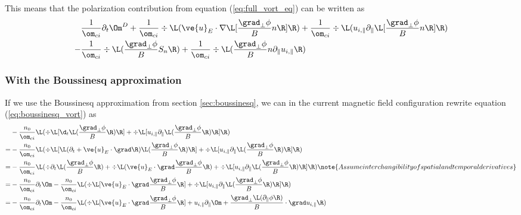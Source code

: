 This means that the polarization contribution from equation
(\ref{eq:full_vort_eq}) can be written as
%
\begin{align*}
    &
    \frac{1}{\om_{ci}}\partial_t\Om^D
    + \frac{1}{\om_{ci}} \div\L(
    \ve{u}_E\cdot\nabla \L[\frac{\grad_\perp \phi}{B}n \R]\R)
    + \frac{1}{\om_{ci}} \div\L(
    u_{i,\|}\partial_\|\L[\frac{\grad_\perp \phi}{B}n\R]\R)
    \\
    -&
  \frac{1}{\om_{ci}} \div\L( \frac{\grad_\perp \phi}{B} S_{n} \R)
 + \frac{1}{\om_{ci}}
 \div\L( \frac{\grad_\perp \phi}{B} n \partial_\| u_{i,\|} \R)
\end{align*}

\subsubsection{With the Boussinesq approximation}
If we use the Boussinesq approximation from section \ref{sec:boussinesq}, we
can in the current magnetic field configuration rewrite equation
(\ref{eq:boussinesq_vort}) as
%
\begin{align*}
    &- \frac{n_0}{\om_{ci}}
    \L( \div\L[ \d_t \L( \frac{\grad_\perp \phi}{B} \R) \R]
     + \div\L[ u_{i,\|}\partial_\| \L( \frac{\grad_\perp \phi}{B} \R) \R] \R)
     \\
     =&
     - \frac{n_0}{\om_{ci}}
     \L( \div\L[ \L(\partial_t
     + \ve{u}_E\cdot\grad\R) \L( \frac{\grad_\perp \phi}{B} \R) \R]
     + \div\L[ u_{i,\|}\partial_\| \L( \frac{\grad_\perp \phi}{B} \R) \R] \R)
     \\
     =&
     - \frac{n_0}{\om_{ci}}
     \L( \div \partial_t\L( \frac{\grad_\perp \phi}{B} \R)
     + \div \L(\ve{u}_E\cdot\grad \frac{\grad_\perp \phi}{B} \R)
     + \div\L[ u_{i,\|}\partial_\| \L( \frac{\grad_\perp \phi}{B} \R) \R] \R)
     \note{Assume interchangibility of spatial and temporal derivatives}
     \\
     =&
     - \frac{n_0}{\om_{ci}}\partial_t\Om
     - \frac{n_0}{\om_{ci}}
     \L(
     \div \L[\ve{u}_E\cdot\grad \frac{\grad_\perp \phi}{B} \R]
     + \div\L[ u_{i,\|}\partial_\| \L( \frac{\grad_\perp \phi}{B} \R) \R] \R)
     \\
     =&
     - \frac{n_0}{\om_{ci}}\partial_t\Om
     - \frac{n_0}{\om_{ci}}
     \L(
     \div \L[\ve{u}_E\cdot\grad \frac{\grad_\perp \phi}{B} \R]
     + u_{i,\|}\partial_\|\Om
     + \frac{\grad_\perp\L( \partial_\|\phi\R)}{B}\cdot\grad u_{i,\|}
     \R)
\end{align*}

